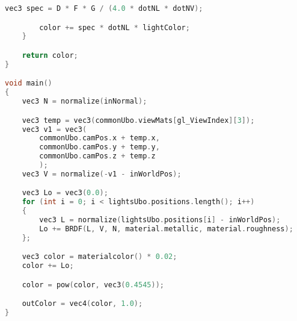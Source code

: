 \begin{itemize}
\begin{lstlisting}[language=c++, caption=PBR fragment shader(./assets/shaders/pbr.frag)]
        vec3 spec = D * F * G / (4.0 * dotNL * dotNV);

        color += spec * dotNL * lightColor;
    }

    return color;
}

void main()
{
    vec3 N = normalize(inNormal);

    vec3 temp = vec3(commonUbo.viewMats[gl_ViewIndex][3]);
    vec3 v1 = vec3(
        commonUbo.camPos.x + temp.x,
        commonUbo.camPos.y + temp.y,
        commonUbo.camPos.z + temp.z
        );
    vec3 V = normalize(-v1 - inWorldPos);

    vec3 Lo = vec3(0.0);
    for (int i = 0; i < lightsUbo.positions.length(); i++)
    {
        vec3 L = normalize(lightsUbo.positions[i] - inWorldPos);
        Lo += BRDF(L, V, N, material.metallic, material.roughness);
    };

    vec3 color = materialcolor() * 0.02;
    color += Lo;

    color = pow(color, vec3(0.4545));

    outColor = vec4(color, 1.0);
}
\end{lstlisting}
\end{itemize}